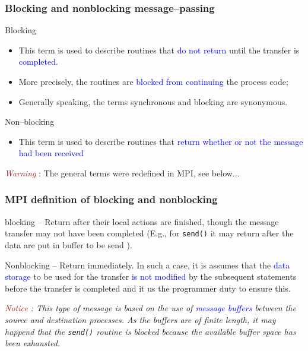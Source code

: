 \documentclass{beamer}
\begin{document}
\begin{frame}
\frametitle{Blocking and nonblocking message--passing}

\alert{Blocking}
\begin{itemize}
\item This term is used to describe routines that \textcolor{blue}{do not return} until the transfer is \textcolor{blue}{completed}.
\item More precisely, the routines are \textcolor{blue}{blocked from continuing} the process code;
\item Generally speaking, the terms \alert{synchronous} and \alert{blocking}
  are synonymous.
\end{itemize}

\alert{Non--blocking}
\begin{itemize}
\item This term is used to describe routines that \textcolor{blue}{return whether or not the message had been received}
\end{itemize}

\textsl{\textcolor{brown}{Warning}} : The general terms were redefined in MPI, see below...
\end{frame}

\begin{frame}
\frametitle{MPI definition of blocking and nonblocking}

\alert{blocking} -- Return after their local actions are finished, though the
message transfer may not have been completed (E.g., for \texttt{send()} it
may return after the data are put in buffer to be send ).

\alert{Nonblocking} -- Return immediately. In such a case, it is assumes that
the \textcolor{blue}{data storage} to be used for the transfer \textcolor{blue}{is not modified} by the subsequent statements before the transfer is completed and it us the programmer duty to ensure this.

\textsl{\textcolor{brown}{Notice} : This type of message is based on the use of
\textcolor{blue}{message buffers} between the source and destination processes. As the buffers are of finite length, it may happend that the \texttt{send()} routine is blocked because the available buffer space has been exhausted.}
\end{frame}
\end{document}
